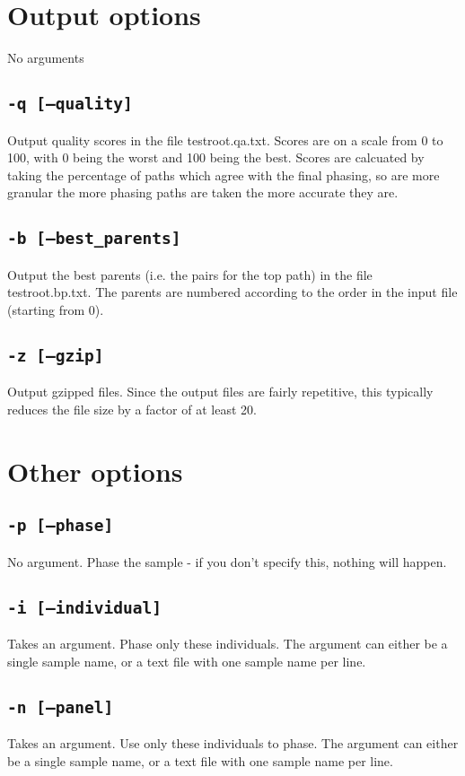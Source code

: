 \documentclass[10pt]{refart}
\begin{document}
\newpage
\section{Output options}
No arguments
\subsection{\texttt{-q [--quality]}}
Output quality scores in the file {testroot}.qa.txt. Scores are on a scale from 0 to 100, with 0 being the worst and 100 being the best. Scores are calcuated by taking the percentage of paths which agree with the final phasing, so are more granular the more phasing paths are taken the more accurate they are. 

\subsection{\texttt{-b [--best\_parents]}}
Output the best parents (i.e. the pairs for the top path) in the file {testroot}.bp.txt. The parents are numbered according to the order in the input file (starting from 0). 

\subsection{\texttt{-z [--gzip]}}
Output gzipped files. Since the output files are fairly repetitive, this typically reduces the file size by a factor of at least 20. 

\newpage

\section{Other options}
\subsection{\texttt{-p [--phase]}}
No argument. Phase the sample - if you don't specify this, nothing will happen.

\subsection{\texttt{-i [--individual]}}
Takes an argument. Phase only these individuals. The argument can either be a single sample name, or a text file with one sample name per line. 

\subsection{\texttt{-n [--panel]}}
Takes an argument. Use only these individuals to phase. The argument
can either be a single sample name, or a text file with one sample
name per line. 
\end{document}
